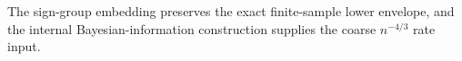 The sign-group embedding preserves the exact finite-sample lower envelope, and the internal Bayesian-information construction supplies the coarse \(n^{-4/3}\) rate input.